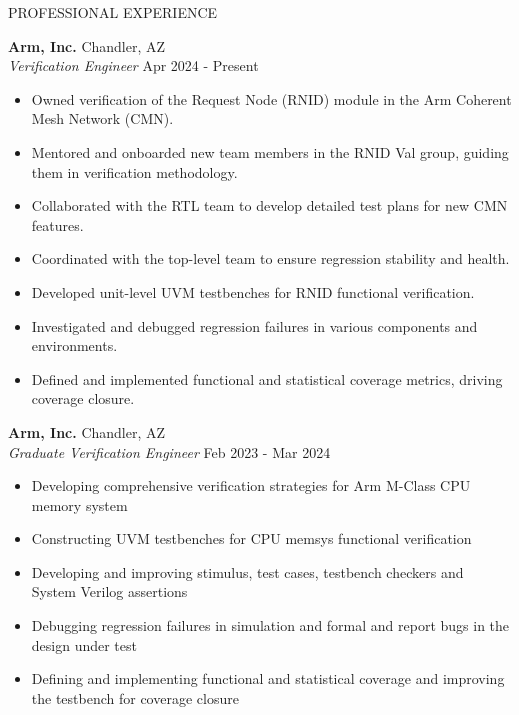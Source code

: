 \documentclass{resume} %
\newcommand{\myitemsep}{\itemsep -0.6em}
\begin{document}
  \begin{rSection}{PROFESSIONAL EXPERIENCE}

    \textbf{Arm, Inc.}                          \hfill Chandler, AZ         \\
    \emph{Verification Engineer}                             \hfill Apr 2024 - Present   \\
    \LineShrinkBeforeItem
    \begin{itemize} [leftmargin=1em]
      \myitemsep
      \item Owned verification of the Request Node (RNID) module in the Arm Coherent Mesh Network (CMN).
      \item Mentored and onboarded new team members in the RNID Val group, guiding them in verification methodology.
      \item Collaborated with the RTL team to develop detailed test plans for new CMN features.
      \item Coordinated with the top-level team to ensure regression stability and health.
      \item Developed unit-level UVM testbenches for RNID functional verification.
      \item Investigated and debugged regression failures in various components and environments.
      \item Defined and implemented functional and statistical coverage metrics, driving coverage closure.
    \end{itemize}

    \textbf{Arm, Inc.}                          \hfill Chandler, AZ         \\
    \emph{Graduate Verification Engineer}       \hfill Feb 2023 - Mar 2024  \\
    \LineShrinkBeforeItem
    \begin{itemize} [leftmargin=1em]
      \myitemsep
      \item Developing comprehensive verification strategies for Arm M-Class CPU memory system
      \item Constructing UVM testbenches for CPU memsys functional verification
      \item Developing and improving stimulus, test cases, testbench checkers and System Verilog assertions
      \item Debugging regression failures in simulation and formal and report bugs in the design under test
      \item Defining and implementing functional and statistical coverage and improving the testbench for coverage closure
    \end{itemize}


\end{rSection}
\end{document}
